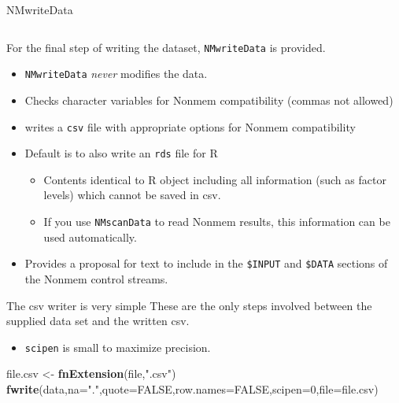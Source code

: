 \documentclass[
  8pt,
  ignorenonframetext,
  aspectratio=169]{beamer}
\newenvironment{Shaded}{\begin{snugshade}}{\end{snugshade}}
\newcommand{\DataTypeTok}[1]{\textcolor[rgb]{0.13,0.29,0.53}{#1}}
\newcommand{\DecValTok}[1]{\textcolor[rgb]{0.00,0.00,0.81}{#1}}
\newcommand{\KeywordTok}[1]{\textcolor[rgb]{0.13,0.29,0.53}{\textbf{#1}}}
\newcommand{\NormalTok}[1]{#1}
\newcommand{\OtherTok}[1]{\textcolor[rgb]{0.56,0.35,0.01}{#1}}
\newcommand{\StringTok}[1]{\textcolor[rgb]{0.31,0.60,0.02}{#1}}
\providecommand{\tightlist}{%
  \setlength{\itemsep}{0pt}\setlength{\parskip}{0pt}}
\begin{document}
\begin{frame}[fragile]{NMwriteData}
\protect\hypertarget{nmwritedata}{}
\begin{columns}[T]
\begin{column}{0.48\textwidth}
For the final step of writing the dataset, \texttt{NMwriteData} is
provided.

\begin{itemize}
\tightlist
\item
  \texttt{NMwriteData} \emph{never} modifies the data.
\item
  Checks character variables for Nonmem compatibility (commas not
  allowed)
\item
  writes a \texttt{csv} file with appropriate options for Nonmem
  compatibility
\item
  Default is to also write an \texttt{rds} file for R

  \begin{itemize}
  \tightlist
  \item
    Contents identical to R object including all information (such as
    factor levels) which cannot be saved in csv.
  \item
    If you use \texttt{NMscanData} to read Nonmem results, this
    information can be used automatically.
  \end{itemize}
\item
  Provides a proposal for text to include in the \texttt{\$INPUT} and
  \texttt{\$DATA} sections of the Nonmem control streams.
\end{itemize}

\begin{block}{The csv writer is very simple}
\protect\hypertarget{the-csv-writer-is-very-simple}{}
These are the only steps involved between the supplied data set and the
written csv.

\begin{itemize}
\tightlist
\item
  \texttt{scipen} is small to maximize precision.
\end{itemize}

\footnotesize

\begin{Shaded}
\begin{Highlighting}[]
\NormalTok{file.csv \textless{}{-}}\StringTok{ }\KeywordTok{fnExtension}\NormalTok{(file,}\StringTok{".csv"}\NormalTok{)}
\KeywordTok{fwrite}\NormalTok{(data,}\DataTypeTok{na=}\StringTok{"."}\NormalTok{,}\DataTypeTok{quote=}\OtherTok{FALSE}\NormalTok{,}\DataTypeTok{row.names=}\OtherTok{FALSE}\NormalTok{,}\DataTypeTok{scipen=}\DecValTok{0}\NormalTok{,}\DataTypeTok{file=}\NormalTok{file.csv)}
\end{Highlighting}
\end{Shaded}


\end{block}
\end{column}
\end{columns}
\end{frame}
\end{document}
